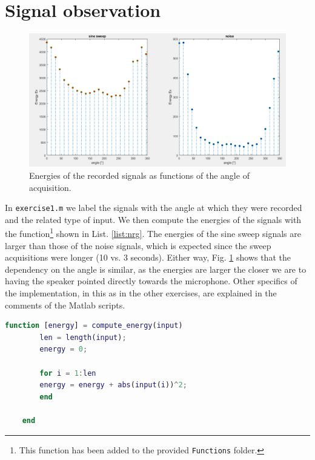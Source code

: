 \documentclass[a4paper]{article}
\begin{document}
\section{Signal observation}
\begin{figure}[h]
	\centering
	\includegraphics[width=0.75\linewidth]{sig_energy.png}
	\caption{Energies of the recorded signals as functions of the angle of acquisition.}
	\label{fig:energy}
\end{figure}

In \verb|exercise1.m| we label the signals with the angle at which they were recorded and the related type of input. We then compute the energies of the signals with the function\footnote{This function has been added to the provided \texttt{Functions} folder.} shown in List. \ref{list:nrg}. The energies of the sine sweep signals are larger than those of the noise signals, which is expected since the sweep acquisitions were longer (10 vs. 3 seconds). Either way, Fig. \ref{fig:energy} shows that the dependency on the angle is similar, as the energies are larger the closer we are to having the speaker pointed directly towards the microphone. Other specifics of the implementation, in this as in the other exercises, are explained in the comments of the Matlab scripts.

\begin{lstlisting}[language=Matlab, caption=compute\_energy.m, label=list:nrg]
	function [energy] = compute_energy(input)
		len = length(input);
		energy = 0;
		
		for i = 1:len
		energy = energy + abs(input(i))^2;
		end
	
	end
\end{lstlisting}
\end{document}
